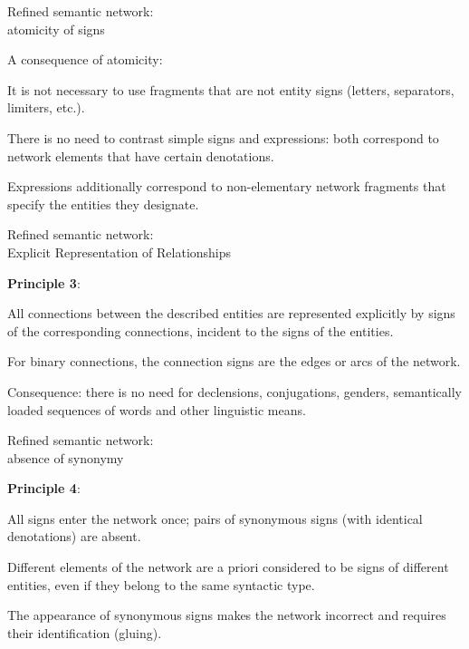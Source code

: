\begin{frame}{Refined semantic network:\\atomicity of signs}
	\topline
	\justifying
	
	A consequence of atomicity:
	\begin{textitemize}
		\item It is not necessary to use fragments that are not entity signs (letters, separators, limiters, etc.).
		\item There is no need to contrast simple signs and expressions: both correspond to network elements that have certain denotations.
		\item Expressions additionally correspond to non-elementary network fragments that specify the entities they designate.
	\end{textitemize}
	
\end{frame}


\begin{frame}{Refined semantic network:\\Explicit Representation of Relationships}
	\topline
	\justifying
	
	\textbf{Principle 3}:
	\begin{textitemize}
		\item All connections between the described entities are represented explicitly by signs of the corresponding connections, incident to the signs of the entities.
		\item For binary connections, the connection signs are the edges or arcs of the network.
	\end{textitemize}
	
	\medskip
	Consequence: there is no need for declensions, conjugations, genders, semantically loaded sequences of words and other linguistic means.
	
\end{frame}


\begin{frame}{Refined semantic network:\\absence of synonymy}
	\topline
	\justifying
	
	\textbf{Principle 4}:
	\begin{textitemize}
		\item All signs enter the network once; pairs of synonymous signs (with identical denotations) are absent.
		\item Different elements of the network are a priori considered to be signs of different entities, even if they belong to the same syntactic type.
	\end{textitemize}
	
	\medskip
	The appearance of synonymous signs makes the network incorrect and requires their identification (gluing).
	
\end{frame}


